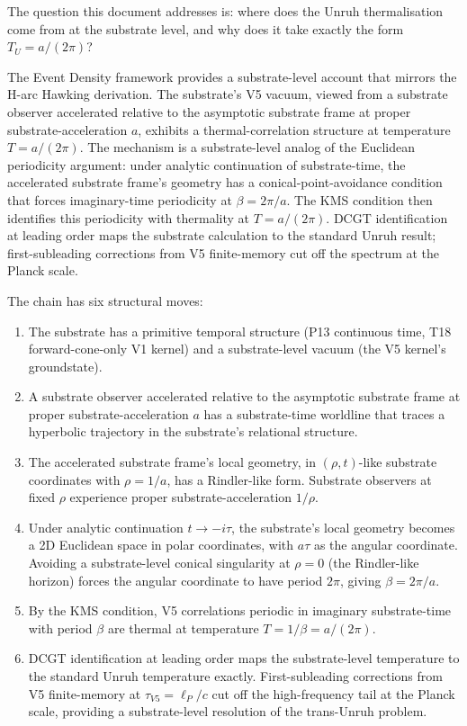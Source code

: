 \documentclass[11pt,a4paper]{article}
\begin{document}
The question this document addresses is: where does the Unruh thermalisation come from at the substrate level, and why does it take exactly the form $T_U = a/(2\pi)$?

The Event Density framework provides a substrate-level account that mirrors the H-arc Hawking derivation. The substrate's V5 vacuum, viewed from a substrate observer accelerated relative to the asymptotic substrate frame at proper substrate-acceleration $a$, exhibits a thermal-correlation structure at temperature $T = a/(2\pi)$. The mechanism is a substrate-level analog of the Euclidean periodicity argument: under analytic continuation of substrate-time, the accelerated substrate frame's geometry has a conical-point-avoidance condition that forces imaginary-time periodicity at $\beta = 2\pi/a$. The KMS condition then identifies this periodicity with thermality at $T = a/(2\pi)$. DCGT identification at leading order maps the substrate calculation to the standard Unruh result; first-subleading corrections from V5 finite-memory cut off the spectrum at the Planck scale.

The chain has six structural moves:

\begin{enumerate}[noitemsep]
\item The substrate has a primitive temporal structure (P13 continuous time, T18 forward-cone-only V1 kernel) and a substrate-level vacuum (the V5 kernel's groundstate).
\item A substrate observer accelerated relative to the asymptotic substrate frame at proper substrate-acceleration $a$ has a substrate-time worldline that traces a hyperbolic trajectory in the substrate's relational structure.
\item The accelerated substrate frame's local geometry, in $(\rho, t)$-like substrate coordinates with $\rho = 1/a$, has a Rindler-like form. Substrate observers at fixed $\rho$ experience proper substrate-acceleration $1/\rho$.
\item Under analytic continuation $t \to -i\tau$, the substrate's local geometry becomes a 2D Euclidean space in polar coordinates, with $a\tau$ as the angular coordinate. Avoiding a substrate-level conical singularity at $\rho = 0$ (the Rindler-like horizon) forces the angular coordinate to have period $2\pi$, giving $\beta = 2\pi/a$.
\item By the KMS condition, V5 correlations periodic in imaginary substrate-time with period $\beta$ are thermal at temperature $T = 1/\beta = a/(2\pi)$.
\item DCGT identification at leading order maps the substrate-level temperature to the standard Unruh temperature exactly. First-subleading corrections from V5 finite-memory at $\tau_{V5} = \ell_P/c$ cut off the high-frequency tail at the Planck scale, providing a substrate-level resolution of the trans-Unruh problem.
\end{enumerate}
\end{document}
